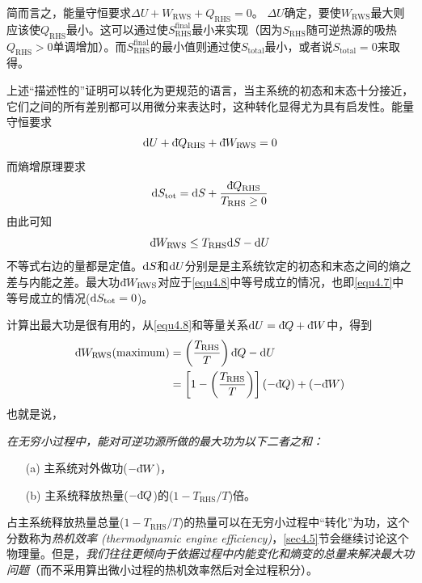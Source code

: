 简而言之，能量守恒要求$\Delta U + W_{\text{RWS}} + Q_{\text{RHS}} = 0$。 $\Delta U$确定，要使$W_{\text{RWS}}$最大则应该使$Q_{\text{RHS}}$最小。这可以通过使$S^{\text{final}}_{\text{RHS}}$最小来实现（因为$S_{\text{RHS}}$随可逆热源的吸热$Q_{\text{RHS}} > 0$单调增加）。而$S^{\text{final}}_{\text{RHS}}$的最小值则通过使$S_{\text{total}}$最小，或者说$S_{\text{total}} = 0$来取得。

上述“描述性的”证明可以转化为更规范的语言，当主系统的初态和末态十分接近，它们之间的所有差别都可以用微分来表达时，这种转化显得尤为具有启发性。能量守恒要求
\begin{equation}
\label{equ4.6}
\mathrm{d} U + \mathrm d\hspace*{-0.1em}\bar{}\hspace*{0.08em} Q_{\text{RHS}} + \mathrm d\hspace*{-0.1em}\bar{}\hspace*{0.08em} W_{\text{RWS}} = 0
\end{equation}
而熵增原理要求
\begin{equation}
\label{equ4.7}
\mathrm{d} S_{\text{tot}} = \mathrm{d} S + \frac{\mathrm d\hspace*{-0.1em}\bar{}\hspace*{0.08em} Q_{\text{RHS}}}{T_{\text{RHS}} \ge 0}
\end{equation}
由此可知
\begin{equation}
\label{equ4.8}
\mathrm d\hspace*{-0.1em}\bar{}\hspace*{0.08em} W_{\text{RWS}} \le T_{\text{RHS}} \mathrm{d} S - \mathrm{d} U 
\end{equation}
不等式右边的量都是定值。$\mathrm{d} S$和$\mathrm{d} U$分别是是主系统钦定的初态和末态之间的熵之差与内能之差。最大功$\mathrm d\hspace*{-0.1em}\bar{}\hspace*{0.08em} W_{\text{RWS}}$对应于\eqref{equ4.8}中等号成立的情况，也即\eqref{equ4.7}中等号成立的情况($\mathrm{d} S_{\text{tot}} = 0$)。

计算出最大功是很有用的，从\eqref{equ4.8}和等量关系$\mathrm{d} U = \mathrm d\hspace*{-0.1em}\bar{}\hspace*{0.08em} Q + \mathrm d\hspace*{-0.1em}\bar{}\hspace*{0.08em} W$中，得到
\begin{equation}
\label{equ4.9}
\begin{split}
\mathrm d\hspace*{-0.1em}\bar{}\hspace*{0.08em} W_{\text{RWS}} (\text{maximum}) &= \left( \frac{T_{\text{RHS}}}{T} \right) \mathrm d\hspace*{-0.1em}\bar{}\hspace*{0.08em} Q - \mathrm{d} U \\
&= \left[ 1 - \left( \frac{T_{\text{RHS}}}{T} \right) \right] (-\mathrm d\hspace*{-0.1em}\bar{}\hspace*{0.08em} Q) + (-\mathrm d\hspace*{-0.1em}\bar{}\hspace*{0.08em} W)
\end{split}
\end{equation} 
也就是说，{\it 在无穷小过程中，能对可逆功源所做的最大功为以下二者之和：

\begin{enumerate}
\item[(a)] 主系统对外做功($-\mathrm d\hspace*{-0.1em}\bar{}\hspace*{0.08em} W$)，  
\item[(b)] 主系统释放热量($-\mathrm d\hspace*{-0.1em}\bar{}\hspace*{0.08em} Q$)的($1 - T_{\text{RHS}}/T$)倍。
\end{enumerate}}
占主系统释放热量总量($1 - T_{\text{RHS}}/T$)的热量可以在无穷小过程中“转化”为功，这个分数称为{\it 热机效率 (thermodynamic engine efficiency)}，\ref{sec4.5}节会继续讨论这个物理量。但是，{\it 我们往往更倾向于依据过程中内能变化和熵变的总量来解决最大功问题}（而不采用算出微小过程的热机效率然后对全过程积分）。

